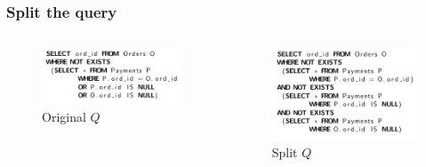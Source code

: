 \documentclass{beamer}
\begin{document}
		\begin{frame}
			\frametitle{Split the query}
			\begin{columns}
				\begin{column}{0.48\textwidth}
					\begin{figure}
						\includegraphics[scale=0.42]{rq}
						\caption{Original $Q$}
					\end{figure}
				\end{column}
				\begin{column}{0.48\textwidth}
					\begin{figure}
						\includegraphics[scale=0.42]{rqsplit}
						\caption{Split $Q$}
					\end{figure}
				\end{column}
			\end{columns}
		\end{frame}
		
\end{document}
